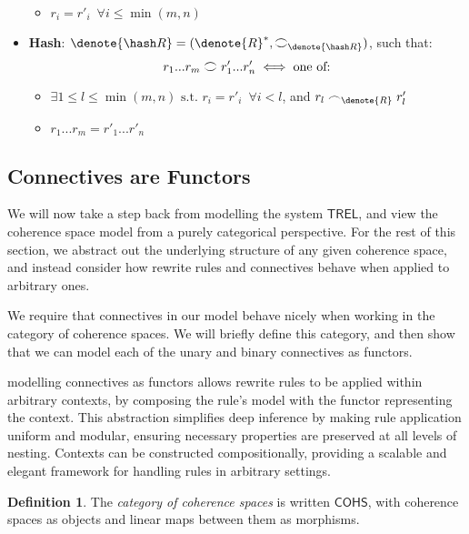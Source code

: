 \documentclass[11pt, oneside]{article}
\theoremstyle{plain}
\theoremstyle{definition}
\newtheorem{definition}[theorem]{Definition}
\DeclarePairedDelimiter\denote\llbracket\rrbracket
\newcommand{\sSys}{{\mathsf{TREL}}}%
\newcommand{\cohs}{{\mathsf{COHS}}}
\newcommand{\coh}[1][]{\mathrel{\vcenter{\offinterlineskip\hbox{$\frown$}\vskip0.2ex\hbox{$\smile$}}_{\ifx\\#1\\\else#1\fi}}}
\newcommand{\scoh}[1][]{\mathrel{\frown}_{\ifx\\#1\\\else#1\fi}}
\begin{document}
\begin{itemize}
\begin{itemize}
    \item
    $r_i = r'_i \enspace\forall i\le\min(m,n)$
\end{itemize}

\item
\textbf{Hash}: $\denote{\hash R} = (\denote{R}^*, \coh[\denote{\hash R}])$, such that:
$$r_1...r_m \coh r'_1...r'_n \iff \text{one of:}$$

\begin{itemize}
    \item
    $\exists 1\leq l \leq \min(m,n) \text{ s.t. } r_i=r'_i \enspace\forall i<l$, and $r_l \scoh[\denote{R}] r'_l$

    \item
    $r_1...r_m = r'_1...r'_n$
\end{itemize}

\end{itemize}

\subsection{Connectives are Functors}

We will now take a step back from modelling the system $\sSys$, and view the coherence space model from a purely categorical perspective.
For the rest of this section, we abstract out the underlying structure of any given coherence space, and instead consider how rewrite rules and connectives behave when applied to arbitrary ones.

We require that connectives in our model behave nicely when working in the category of coherence spaces.
We will briefly define this category, and then show that we can model each of the unary and binary connectives as functors.

modelling connectives as functors allows rewrite rules to be applied within arbitrary contexts, by composing the rule's model with the functor representing the context.
This abstraction simplifies deep inference by making rule application uniform and modular, ensuring necessary properties are preserved at all levels of nesting.
Contexts can be constructed compositionally, providing a scalable and elegant framework for handling rules in arbitrary settings.

\begin{definition}
    The \textit{category of coherence spaces} is written $\cohs$, with coherence spaces as objects and linear maps between them as morphisms.
\end{definition}
\end{document}
